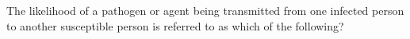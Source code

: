 The likelihood of a pathogen or agent being transmitted from one infected person to another susceptible person is referred to as which of the following?


